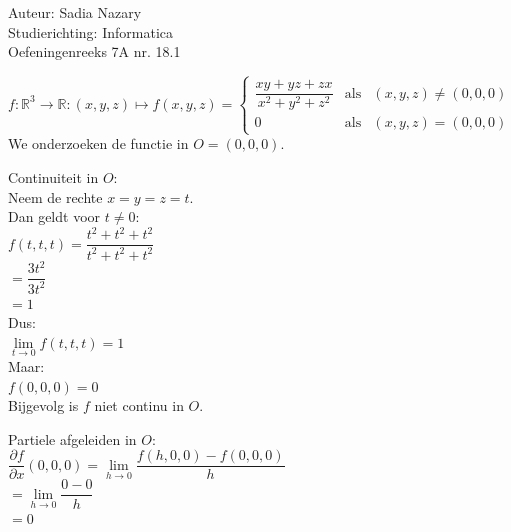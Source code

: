 \documentclass[a4paper]{article}
\newcommand{\R}{\mathbb{R}}
\newcommand{\llim}{\lim\limits}
\begin{document}
\noindent \large Auteur: Sadia Nazary \\
\noindent \large Studierichting: Informatica\\
\noindent \large Oefeningenreeks 7A nr. 18.1\\

\medskip

\normalsize

$f:\R^3\longrightarrow\R:(x,y,z)\mapsto f(x,y,z)=
\left\{
\begin{array}{lll}
\dfrac{xy+yz+zx}{x^2+y^2+z^2} & \text{als} & (x,y,z)\neq(0,0,0)\\
0 & \text{als} & (x,y,z)=(0,0,0)
\end{array}
\right .$\\

We onderzoeken de functie in $O=(0,0,0)$.\\

\medskip

Continuiteit in $O$:\\

Neem de rechte $x=y=z=t$.\\

Dan geldt voor $t\neq0$:\\

$f(t,t,t)
=
\dfrac{t^2+t^2+t^2}{t^2+t^2+t^2}$\\

$=
\dfrac{3t^2}{3t^2}$\\

$=
1$\\

Dus:\\

$\llim_{t\rightarrow0}f(t,t,t)=1$\\

Maar:\\

$f(0,0,0)=0$\\

Bijgevolg is $f$ niet continu in $O$.\\

\medskip

Partiele afgeleiden in $O$:\\

$\dfrac{\partial f}{\partial x}(0,0,0)
=
\llim_{h\rightarrow0}
\dfrac{f(h,0,0)-f(0,0,0)}{h}$\\

$=
\llim_{h\rightarrow0}
\dfrac{0-0}{h}$\\

$=
0$\\
\end{document}
